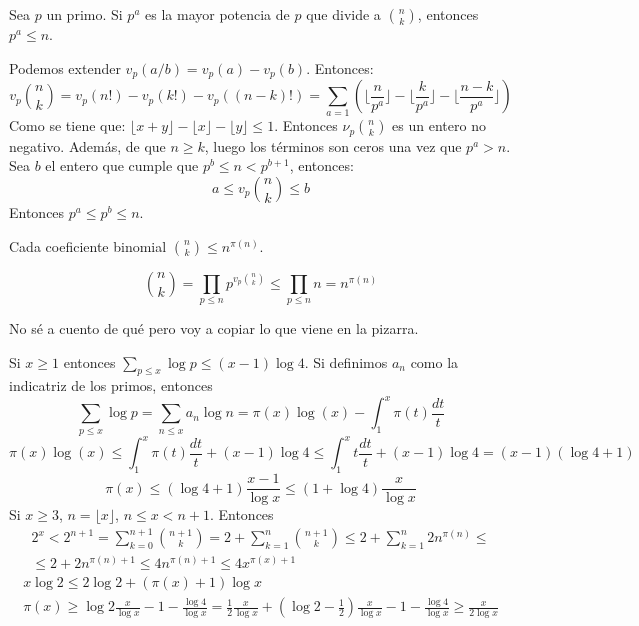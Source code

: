 \documentclass[TAN.tex]{subfiles}
\begin{document}
\begin{lemma}
Sea $p$ un primo. Si $p^a$ es la mayor potencia de $p$ que divide a $\binom{n}{k}$, entonces $p^a ≤ n$.
\end{lemma}
\begin{dem}
Podemos extender $v_p(a/b) = v_p(a)-v_p(b)$. Entonces:
\[ v_p\binom{n}{k} = v_p(n!) - v_p(k!) - v_p((n-k)!) = \sum_{a=1} \left(\lfloor \frac{n}{p^a} \rfloor - \lfloor \frac{k}{p^a}\rfloor - \lfloor \frac{n-k}{p^a} \rfloor\right) \]
Como se tiene que: $\lfloor x+y \rfloor -\lfloor x\rfloor - \lfloor y \rfloor ≤ 1$. Entonces $ν_p\binom{n}{k}$ es un entero no negativo. Además, de que $n ≥ k$, luego los términos son ceros una vez que $p^a>n$. Sea $b$ el entero que cumple que $p^b ≤ n < p^{b+1}$, entonces:
\[ a ≤ v_p\binom{n}{k} ≤ b \]
Entonces $p^a≤p^b≤n$.
\end{dem}

\begin{coro}
Cada coeficiente binomial $\binom{n}{k} ≤ n^{π(n)}$.
\end{coro}
\begin{dem}
\[ \binom{n}{k} = \prod_{p≤n} p^{v_p\binom{n}{k}} ≤ \prod_{p≤n} n = n^{π(n)} \]
\end{dem}

No sé a cuento de qué pero voy a copiar lo que viene en la pizarra.

Si $x\geq 1$ entonces $\sum_{p\leq x} \log p \leq (x-1) \log 4$. Si definimos $a_n$ como la indicatriz de los primos, entonces 
$$\sum_{p\leq x} \log p = \sum_{n\leq x}a_n \log n = \pi(x)\log(x)-\int_1^x \pi(t)\frac{dt}{t}$$
$$\pi(x)\log(x) \leq \int_1^x \pi(t)\frac{dt}{t} + (x-1)\log 4
\leq \int_1^x t\frac{dt}{t} + (x-1)\log4 = (x-1)(\log4 +1)$$
$$ \pi(x)\leq (\log 4 +1) \frac{x-1}{\log x}\leq (1+\log 4)\frac{x}{\log x}$$
Si $x\geq 3$, $n=\lfloor x \rfloor$, $n\leq x < n+1$. Entonces
\begin{gather*}
2^x < 2^{n+1} = \sum_{k=0}^{n+1}\binom{n+1}{k} = 2+ \sum_{k=1}^n \binom{n+1}{k} \leq 2 + \sum_{k=1}^n 2n^{\pi(n)} \leq\\
\leq 2+2n^{\pi(n)+1} \leq 4n^{\pi(n)+1}\leq 4x^{\pi(x)+1}
\end{gather*}
\begin{gather*}
x \log 2 \leq 2\log 2 + (\pi(x)+1)\log x\\
 \pi(x) \geq \log 2 \frac{x}{\log x} -1 -\frac{\log 4}{\log x} = \frac{1}{2}\frac{x}{\log x} +  (\log 2 - \frac{1}{2})\frac{x}{\log x} -1 - \frac{\log4}{\log x} \geq \frac{x}{2\log{x}}
	\end{gather*}
	
\end{document}
